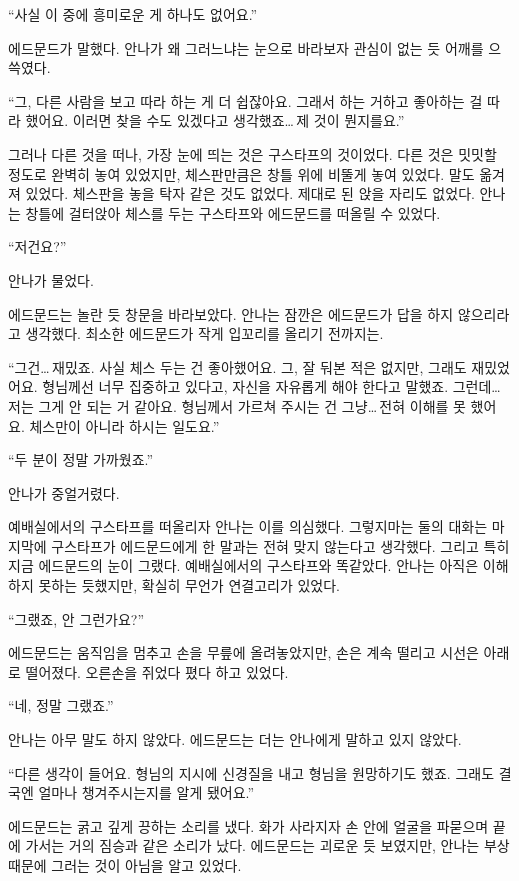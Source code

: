 ``사실 이 중에 흥미로운 게 하나도 없어요.''

에드문드가 말했다. 안나가 왜 그러느냐는 눈으로 바라보자 관심이 없는 듯 어깨를 으쓱였다.

``그, 다른 사람을 보고 따라 하는 게 더 쉽잖아요. 그래서 하는 거하고 좋아하는 걸 따라 했어요. 이러면 찾을 수도 있겠다고 생각했죠\ldots\,제 것이 뭔지를요.''

그러나 다른 것을 떠나, 가장 눈에 띄는 것은 구스타프의 것이었다. 다른 것은 밋밋할 정도로 완벽히 놓여 있었지만, 체스판만큼은 창틀 위에 비뚤게 놓여 있었다. 말도 옮겨져 있었다. 체스판을 놓을 탁자 같은 것도 없었다. 제대로 된 앉을 자리도 없었다. 안나는 창틀에 걸터앉아 체스를 두는 구스타프와 에드문드를 떠올릴 수 있었다.

`` 저건요?''

안나가 물었다.

에드문드는 놀란 듯 창문을 바라보았다. 안나는 잠깐은 에드문드가 답을 하지 않으리라고 생각했다. 최소한 에드문드가 작게 입꼬리를 올리기 전까지는.

``그건\ldots\,재밌죠. 사실 체스 두는 건 좋아했어요. 그, 잘 둬본 적은 없지만, 그래도 재밌었어요. 형님께선 너무 집중하고 있다고, 자신을 자유롭게 해야 한다고 말했죠. 그런데\ldots\,저는 그게 안 되는 거 같아요. 형님께서 가르쳐 주시는 건 그냥\ldots\,전혀 이해를 못 했어요. 체스만이 아니라 하시는 일도요.''

``두 분이 정말 가까웠죠.''

안나가 중얼거렸다.

예배실에서의 구스타프를 떠올리자 안나는 이를 의심했다. 그렇지마는 둘의 대화는 마지막에 구스타프가 에드문드에게 한 말과는 전혀 맞지 않는다고 생각했다. 그리고 특히 지금 에드문드의 눈이 그랬다. 예배실에서의 구스타프와 똑같았다. 안나는 아직은 이해하지 못하는 듯했지만, 확실히 무언가 연결고리가 있었다.

``그랬죠, 안 그런가요?''

에드문드는 움직임을 멈추고 손을 무릎에 올려놓았지만, 손은 계속 떨리고 시선은 아래로 떨어졌다. 오른손을 쥐었다 폈다 하고 있었다.

``네, 정말 그랬죠.''

안나는 아무 말도 하지 않았다. 에드문드는 더는 안나에게 말하고 있지 않았다.

`` 다른 생각이 들어요. 형님의 지시에 신경질을 내고 형님을 원망하기도 했죠. 그래도 결국엔 얼마나 챙겨주시는지를 알게 됐어요.''

에드문드는 굵고 깊게 끙하는 소리를 냈다. 화가 사라지자 손 안에 얼굴을 파묻으며 끝에 가서는 거의 짐승과 같은 소리가 났다. 에드문드는 괴로운 듯 보였지만, 안나는 부상 때문에 그러는 것이 아님을 알고 있었다.

